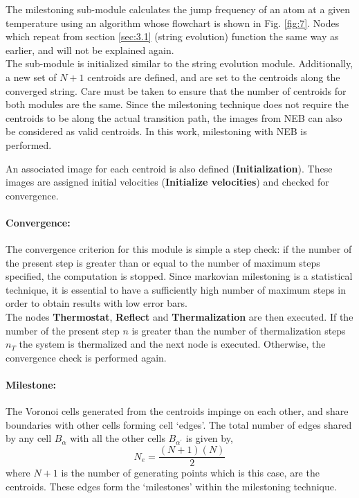 \documentclass{article}
\begin{document}
The milestoning sub-module calculates the jump frequency of an atom at a given temperature using an algorithm whose flowchart is shown in Fig. \ref{fig:7}. Nodes which repeat from section \ref{sec:3.1} (string evolution) function the same way as earlier, and will not be explained again. \\

\noindent The sub-module is initialized similar to the string evolution module. Additionally, a new set of $N + 1$ centroids are defined, and are set to the centroids along the converged string. Care must be taken to ensure that the number of centroids for both modules are the same. Since the milestoning technique does not require the centroids to be along the actual transition path, the images from NEB can also be considered as valid centroids. In this work, milestoning with NEB is performed.

An associated image for each centroid is also defined (\textbf{Initialization}). These images are assigned initial velocities (\textbf{Initialize velocities}) and checked for convergence.

\paragraph*{Convergence:}

The convergence criterion for this module is simple a step check: if the number of the present step is greater than or equal to the number of maximum steps specified, the computation is stopped. Since markovian milestoning is a statistical technique, it is essential to have a sufficiently high number of maximum steps in order to obtain results with low error bars. \\

\noindent The nodes \textbf{Thermostat}, \textbf{Reflect} and \textbf{Thermalization} are then executed. If the number of the present step $n$ is greater than the number of thermalization steps $n_T$ the system is thermalized and the next node is executed. Otherwise, the convergence check is performed again.

\paragraph*{Milestone:}

The Voronoi cells generated from the centroids impinge on each other, and share boundaries with other cells forming cell \enquote*{edges}. The total number of edges shared by any cell $B_{\alpha}$ with all the other cells $B_{\alpha^{\prime}}$ is given by,
%
\begin{equation} \label{eq:34}
N_e = \dfrac{(N +1)(N)}{2}
\end{equation}
%
where $N + 1$ is the number of generating points which is this case, are the centroids. These edges form the \enquote*{milestones} within the milestoning technique.\\
\end{document}

